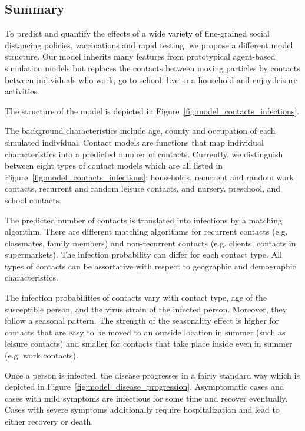 \subsection{Summary}
\label{sub:model_summary}

To predict and quantify the effects of a wide variety of fine-grained social distancing
policies, vaccinations and rapid testing, we propose a different model structure. Our
model inherits many features from prototypical agent-based simulation models but
replaces the contacts between moving particles by contacts between individuals who work,
go to school, live in a household and enjoy leisure activities.

The structure of the model is depicted in Figure~\ref{fig:model_contacts_infections}.

The background characteristics include age, county and occupation of each simulated
individual. Contact models are functions that map individual characteristics into a
predicted number of contacts. Currently, we distinguish between eight types of contact
models which are all listed in Figure~\ref{fig:model_contacts_infections}: households,
recurrent and random work contacts, recurrent and random leisure contacts, and nursery,
preschool, and school contacts.

The predicted number of contacts is translated into infections by a matching algorithm.
There are different matching algorithms for recurrent contacts (e.g. classmates, family
members) and non-recurrent contacts (e.g. clients, contacts in supermarkets). The
infection probability can differ for each contact type. All types of contacts can be
assortative with respect to geographic and demographic characteristics.

The infection probabilities of contacts vary with contact type, age of the susceptible
person, and the virus strain of the infected person. Moreover, they follow a seasonal
pattern. The strength of the seasonality effect is higher for contacts that are easy to
be moved to an outside location in summer (such as leisure contacts) and smaller for
contacts that take place inside even in summer (e.g. work contacts).

Once a person is infected, the disease progresses in a fairly standard way which is
depicted in Figure~\ref{fig:model_disease_progression}. Asymptomatic cases and cases with mild
symptoms are infectious for some time and recover eventually. Cases with severe symptoms
additionally require hospitalization and lead to either recovery or death.

